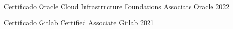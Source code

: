 

\begin{cvhonors}


\cvhonor
  {Certificado} %
  {Oracle Cloud Infrastructure Foundations Associate} %
  {Oracle} %
  {2022} %



  \cvhonor
    {Certificado} %
    {Gitlab Certified Associate} %
    {Gitlab} %
    {2021} %




\end{cvhonors}


